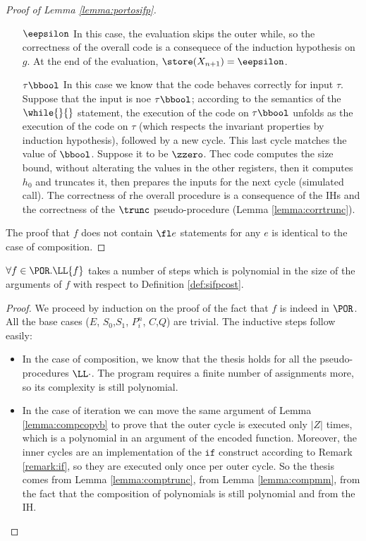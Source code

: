 \begin{proof}[Proof of Lemma \ref{lemma:portosifp}]
\begin{itemize}
  \item [$\eepsilon$] In this case, the evaluation skips the outer while, so the
  correctness of the overall code is a consequece of the induction hypothesis on
  $g$. At the end of the evaluation, $\store(X_{n+1})=\eepsilon$.
  \item [$\tau\bbool$] In this case we know that the code behaves correctly for input
  $\tau$. Suppose that the input is noe $\tau\bbool$; according to the semantics of
  the $\while{}{}$ statement, the execution of the code on $\tau\bbool$ unfolds
  as the execution of the code on $\tau$ (which respects the invariant properties
  by induction hypothesis), followed by a new cycle. This last cycle matches the
  value of $\bbool$. Suppose it to be $\zzero$. Thec code computes the size bound,
  without alterating the values in the other registers, then it computes $h_0$ and
  truncates it, then prepares the inputs for the next cycle (simulated call).
  The correctness of rhe overall procedure is a consequence
  of the IHs and the correctness of the $\trunc$ pseudo-procedure
  (Lemma \ref{lemma:corrtrunc}).
\end{itemize}
The proof that $f$ does not contain $\fl e$ statements for any $e$ is identical
to the case of composition.
\end{proof}

\begin{lemma}
  \label{lemma:compsifpra}
$\forall f \in \POR. \LL{f}$ takes a number of steps which is polynomial in the size of the arguments of $f$ with respect to Definition \ref{def:sifpcost}.
\end{lemma}
\begin{proof}
We proceed by induction on the proof of the fact that $f$ is indeed in $\POR$. All the base cases ($E$, $S_0$,$S_1$, ${P}^n_i$, $C$,$Q$) are trivial. The inductive steps follow easily:
\begin{itemize}
\item In the case of composition, we know that the thesis holds for all the pseudo-procedures $\LL\cdot$. The program requires a finite number of assignments more, so its complexity is still polynomial.
\item In the case of iteration we can move the same argument of Lemma \ref{lemma:compcopyb} to prove that the outer cycle is executed only $|Z|$ times, which is a polynomial in an argument of the encoded function. Moreover, the inner cycles are an implementation of the $\mathtt{if}$ construct according to Remark \ref{remark:if}, so they are executed only once per outer cycle. So the thesis comes from Lemma \ref{lemma:comptrunc}, from Lemma \ref{lemma:compmm}, from the fact that the composition of polynomials is still polynomial and from the IH.
\end{itemize}
\end{proof}

